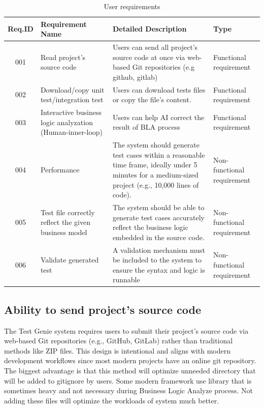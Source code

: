 \begin{table}[H]
	\centering
	\begin{tabular}{|c|p{110pt}|p{8cm}|p{62pt}|}
		\hline
		\textbf{Req.ID} & \textbf{Requirement Name} & \textbf{Detailed Description} & \textbf{Type} \\ \hline
		001 & Read project's source code & Users can send all project's source code at once via web-based Git repositories (e.g github, gitlab) & Functional requirement \\ \hline
		002 & Download/copy unit test/integration test & Users can download tests files or copy the file's content. & Functional requirement \\ \hline
		003 & Interactive business logic analyzation (Human-inner-loop) & Users can help AI correct the result of BLA process & Functional requirement \\ \hline
		004 & Performance & The system should generate test cases within a reasonable time frame, ideally under 5 minutes for a medium-sized project (e.g., 10,000 lines of code). & Non-functional requirement \\ \hline
		005 & Test file correctly reflect the given business model & The system should be able to generate test cases accurately reflect the business logic embedded in the source code. & Non-functional requirement \\ \hline
		006 & Validate generated test & A validation mechanism must be included to the system to ensure the syntax and logic is runnable & Non-functional requirement \\ \hline
	\end{tabular}
	\caption{User requirements}
	\label{tab:user-requirements}
\end{table}

\subsection{Ability to send project's source code}
\hspace{0.5cm}The Test Genie system requires users to submit their project's source code via web-based Git repositories (e.g., GitHub, GitLab) rather than traditional methods like ZIP files. This design is intentional and aligns with modern development workflows since most modern projects have an online git repository. The biggest advantage is that this method will optimize unneeded directory that will be added to gitignore by users. Some modern framework use library that is sometimes heavy and not necessary during Business Logic Analyze process. Not adding these files will optimize the workloads of system much better.

